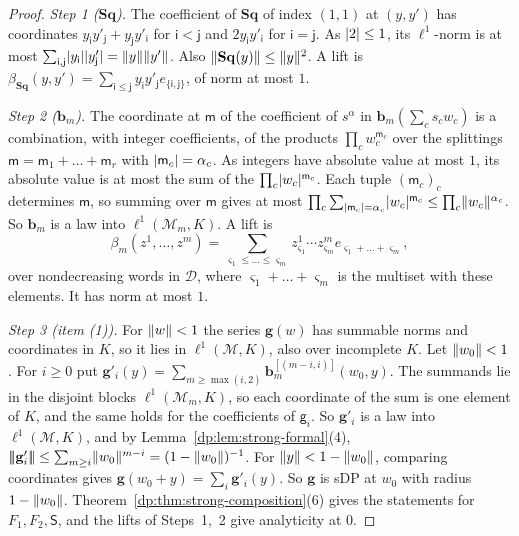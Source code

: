 \begin{proof}
\emph{Step 1 ($\mathbf{Sq}$).} The coefficient of $\mathbf{Sq}$ of index $(1,1)$ at $(y,y')$ has coordinates $y_{\mathsf i}y'_{\mathsf j}+y_{\mathsf j}y'_{\mathsf i}$ for $\mathsf i<\mathsf j$ and $2y_{\mathsf i}y'_{\mathsf i}$ for $\mathsf i=\mathsf j$. As $\lvert 2\rvert\le1$, its $\ell^1$-norm is at most $\sum_{\mathsf i,\mathsf j}\lvert y_{\mathsf i}\rvert\lvert y'_{\mathsf j}\rvert=\lVert y\rVert\lVert y'\rVert$. Also $\lVert \mathbf{Sq}(y)\rVert\le\lVert y\rVert^2$. A lift is $\beta_{\mathbf{Sq}}(y,y')=\sum_{\mathsf i\le\mathsf j}y_{\mathsf i}y'_{\mathsf j}e_{\{\mathsf i,\mathsf j\}}$, of norm at most $1$.

\emph{Step 2 ($\mathbf b_m$).} The coordinate at $\mathsf m$ of the coefficient of $s^\alpha$ in $\mathbf b_m(\sum_cs_cw_c)$ is a combination, with integer coefficients, of the products $\prod_cw_c^{\mathsf m_c}$ over the splittings $\mathsf m=\mathsf m_1+\dots+\mathsf m_r$ with $\lvert \mathsf m_c\rvert=\alpha_c$. As integers have absolute value at most $1$, its absolute value is at most the sum of the $\prod_c\lvert w_c\rvert^{\mathsf m_c}$. Each tuple $(\mathsf m_c)_c$ determines $\mathsf m$, so summing over $\mathsf m$ gives at most $\prod_c\sum_{\lvert \mathsf m_c\rvert=\alpha_c}\lvert w_c\rvert^{\mathsf m_c}\le\prod_c\lVert w_c\rVert^{\alpha_c}$. So $\mathbf b_m$ is a law into $\ell^1(\mathcal M_m,K)$. A lift is
\[
 \beta_m(z^1,\dots,z^m)=\sum_{\varsigma_1\le\dots\le\varsigma_m}z^1_{\varsigma_1}\cdots z^m_{\varsigma_m}e_{\varsigma_1+\dots+\varsigma_m},
\]
over nondecreasing words in $\mathcal D$, where $\varsigma_1+\dots+\varsigma_m$ is the multiset with these elements. It has norm at most $1$.

\emph{Step 3 (item (1)).} For $\lVert w\rVert<1$ the series $\mathbf g(w)$ has summable norms and coordinates in $K$, so it lies in $\ell^1(\mathcal M,K)$, also over incomplete $K$. Let $\lVert w_0\rVert<1$. For $i\ge0$ put $\mathbf g'_i(y)=\sum_{m\ge\max(i,2)}\mathbf b_m^{[(m-i,i)]}(w_0,y)$. The summands lie in the disjoint blocks $\ell^1(\mathcal M_m,K)$, so each coordinate of the sum is one element of $K$, and the same holds for the coefficients of $\mathsf g_i$. So $\mathbf g'_i$ is a law into $\ell^1(\mathcal M,K)$, and by Lemma~\ref{dp:lem:strong-formal}(4), $\lvert\!\lvert\!\lvert \mathbf g'_i\rvert\!\rvert\!\rvert\le\sum_{m\ge i}\lVert w_0\rVert^{m-i}=(1-\lVert w_0\rVert)^{-1}$. For $\lVert y\rVert<1-\lVert w_0\rVert$, comparing coordinates gives $\mathbf g(w_0+y)=\sum_i\mathbf g'_i(y)$. So $\mathbf g$ is sDP at $w_0$ with radius $1-\lVert w_0\rVert$. Theorem~\ref{dp:thm:strong-composition}(6) gives the statements for $F_1,F_2,\mathsf S$, and the lifts of Steps~1,~2 give analyticity at $0$.


\end{proof}
